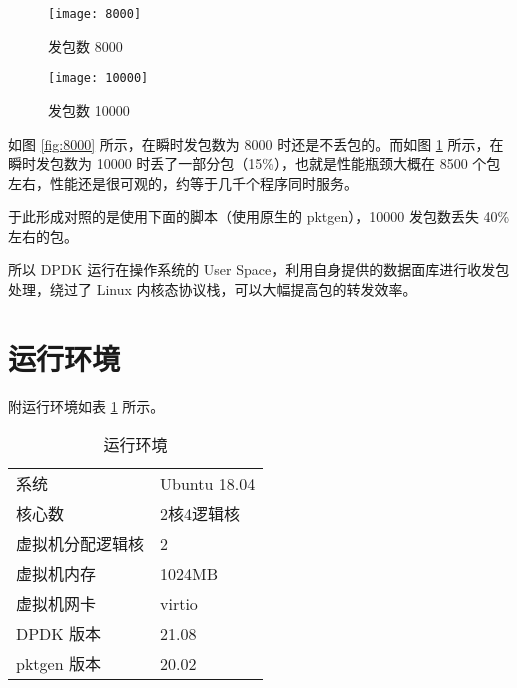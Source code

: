     \begin{figure}[H]
        \centering
        \begin{minipage}{0.48\textwidth}
            \centering
            \texttt{[image: 8000]}
            \caption{发包数 8000}\label{fig:8000}
        \end{minipage}
        \begin{minipage}{0.48\textwidth}
            \centering
            \texttt{[image: 10000]}
            \caption{发包数 10000}\label{fig:10000}
        \end{minipage}
    \end{figure}

    如图 \ref{fig:8000} 所示，在瞬时发包数为 8000 时还是不丢包的。而如图 \ref{fig:10000} 所示，在瞬时发包数为 10000 时丢了一部分包（15\%），也就是性能瓶颈大概在 8500 个包左右，性能还是很可观的，约等于几千个程序同时服务。

    于此形成对照的是使用下面的脚本（使用原生的 pktgen\cite{pktgen}），10000 发包数丢失 40\% 左右的包。


    所以 DPDK 运行在操作系统的 User Space，利用自身提供的数据面库进行收发包处理，绕过了 Linux 内核态协议栈\cite{dpdkinfo}，可以大幅提高包的转发效率。

    \section*{运行环境}

    附运行环境如表 \ref{tab:env} 所示。

    \begin{table}[H]
    \centering
    \caption{运行环境}\label{tab:env}
    \begin{tabular}{ll}
        \toprule
        系统 & Ubuntu 18.04 \\
        核心数 & 2核4逻辑核 \\
        虚拟机分配逻辑核 & 2 \\
        虚拟机内存 & 1024MB \\
        虚拟机网卡 & virtio \\
        DPDK 版本 & 21.08 \\
        pktgen 版本 & 20.02 \\ 
        \bottomrule
    \end{tabular}
    \end{table}

    

